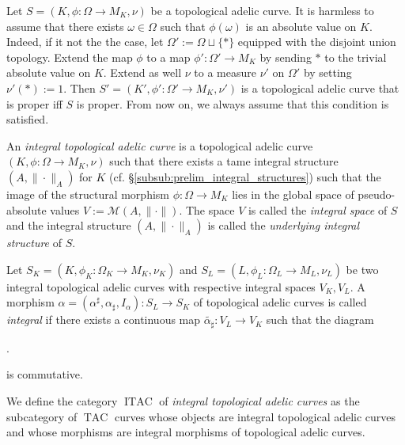 \documentclass [11pt,reqno]{amsart}
\newcommand{\1}{\mathmybb{1}}
\def\cM{{\mathcal{M}}}
\def\ITAC{\operatorname{ITAC}}
\def\TAC{\operatorname{TAC}}
\def\tilde{\widetilde}
\begin{document}
\begin{remark}
\label{rem:tac_existence_of_absolute_value}
Let $S=(K,\phi:\Omega\to M_K,\nu)$ be a topological adelic curve. It is harmless to assume that there exists $\omega\in\Omega$ such that $\phi(\omega)$ is an absolute value on $K$. Indeed, if it not the the case, let $\Omega':=\Omega\sqcup\{\ast\}$ equipped with the disjoint union topology. Extend the map $\phi$ to a map $\phi':\Omega'\to M_{K}$ by sending $\ast$ to the trivial absolute value on $K$. Extend as well $\nu$ to a measure $\nu'$ on $\Omega'$ by setting $\nu'(\ast):=1$. Then $S'=(K',\phi':\Omega'\to M_{K},\nu')$ is a topological adelic curve that is proper iff $S$ is proper. From now on, we always assume that this condition is satisfied.
\end{remark}

\begin{definition}
\label{def:integral_topological_adelic_curves}
An \emph{integral topological adelic curve} is a topological adelic curve $(K,\phi:\Omega\to M_K,\nu)$ such that there exists a tame integral structure $(A,\|\cdot\|_A)$ for $K$ (cf. \S \ref{subsub:prelim_integral_structures}) such that the image of the structural morphism $\phi : \Omega \to M_K$ lies in the global space of pseudo-absolute values $V:=\cM(A,\|\cdot\|)$. The space $V$ is called the \emph{integral space} of $S$ and the integral structure $(A,\|\cdot\|_{A})$ is called the \emph{underlying integral structure} of $S$.

Let $S_K=(K,\phi_K:\Omega_K \to M_K,\nu_K)$ and $S_L=(L,\phi_L:\Omega_L \to M_{L},\nu_L)$ be two integral topological adelic curves with respective integral spaces $V_K,V_L$. A morphism $\alpha=(\alpha^{\sharp},\alpha_{\sharp},I_\alpha) : S_L \rightarrow S_K$ of topological adelic curves  is called \emph{integral} if there exists a continuous map $\tilde{\alpha_{\sharp}} : V_L\to V_K$ such that the diagram 
\begin{center}
.
\end{center}
is commutative. 

We define the category $\ITAC$ of \emph{integral topological adelic curves} as the subcategory of $\TAC$ curves whose objects are integral topological adelic curves and whose morphisms are integral morphisms of topological adelic curves.
\end{definition}
\end{document}

